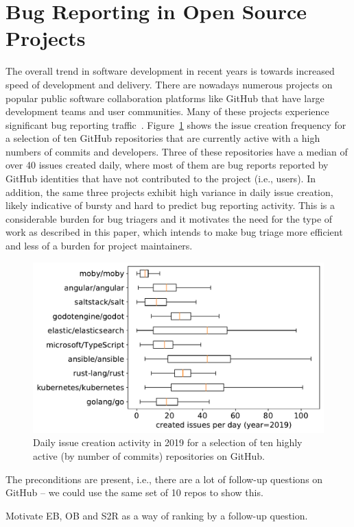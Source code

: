 \section{Bug Reporting in Open Source Projects}


The overall trend in software development in recent years is towards increased
speed of development and delivery. There are nowadays numerous projects on popular
public software collaboration platforms like GitHub that have large development
teams and user communities. Many of these projects experience significant
bug reporting traffic~\cite{Zhang2014ASO}. Figure~\ref{fig:repo_activity} shows the issue creation
frequency for a selection of ten GitHub repositories that are currently active
with a high numbers of commits and developers. Three of these repositories have
a median of over 40 issues created daily, where most of them are bug reports reported by
GitHub identities that have not contributed to the project (i.e., users). In addition,
the same three projects exhibit high variance in daily issue creation, likely indicative
of bursty and hard to predict bug reporting activity. This is a
considerable burden for bug triagers and it motivates the need for the type of work
as described in this paper, which intends to make bug triage more efficient and less of
a burden for project maintainers.

\begin{figure}[t]
\centering
\includegraphics[width=0.99\linewidth]{figures/popular_repos.pdf}
\caption{Daily issue creation activity in 2019 for a selection of ten highly active
(by number of commits) repositories on GitHub.}
\label{fig:repo_activity}
\end{figure}



The preconditions are present, i.e., there are a lot of follow-up questions on GitHub -- we could
use the same set of 10 repos to show this.




Motivate EB, OB and S2R as a way of ranking by a follow-up question.

